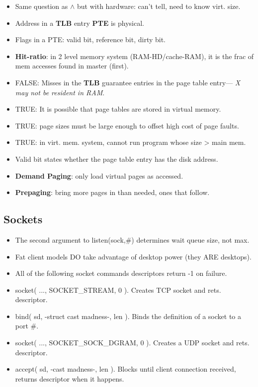 \documentclass[fontsize=4.5pt]{scrartcl}
\begin{document}
\begin{multicols}{3}
\begin{itemize}
        \item Same question as $\wedge$ but with hardware: can't tell, need to know virt. size.
        \item Address in a \textbf{TLB} entry \textbf{PTE} is physical.
        \item Flags in a PTE: valid bit, reference bit, dirty bit.
        \item \textbf{Hit-ratio}: in 2 level memory system (RAM-HD/cache-RAM), it is the frac of mem accesses found in master (first).
        \item FALSE: Misses in the \textbf{TLB} guarantee entries in the page table entry--- \textit{X may not be resident in RAM}.
        \item TRUE: It is possible that page tables are stored in virtual memory.
        \item TRUE: page sizes must be large enough to offset high cost of page faults.
        \item TRUE: in virt. mem. system, cannot run program whose size > main mem.
        \item Valid bit states whether the page table entry has the disk address.
        \item \textbf{Demand Paging}: only load virtual pages as accessed.
        \item \textbf{Prepaging}: bring more pages in than needed, ones that follow.
      \end{itemize}

    \subsection{Sockets}
      \begin{itemize}
        \item The second argument to listen(sock,\#) determines wait queue size, not max.
        \item Fat client models DO take advantage of desktop power (they ARE desktops).
        \item All of the following socket commands descriptors return -1 on failure.
        \item socket( ..., SOCKET\_STREAM, 0 ). Creates TCP socket and rets. descriptor.
        \item bind( sd, -struct cast madness-, len ). Binds the definition of a socket to a port \#.
        \item socket( ..., SOCKET\_SOCK\_DGRAM, 0 ). Creates a UDP socket and rets. descriptor.
        \item accept( sd, -cast madness-, len ). Blocks until client connection received, returns descriptor when it happens.
      \end{itemize}
    

\end{multicols}
\end{document}
